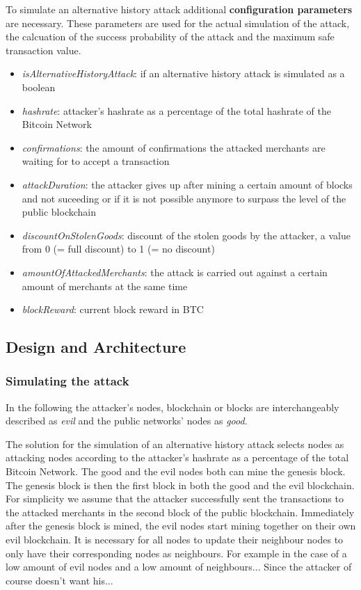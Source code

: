 To simulate an alternative history attack additional \textbf{configuration parameters} are necessary. These parameters are used for the actual simulation of the attack, the calcuation of the success probability of the attack and the maximum safe transaction value.

\begin{itemize}
\item \textit{isAlternativeHistoryAttack}: if an alternative history attack is simulated as a boolean
\item \textit{hashrate}: attacker's hashrate as a percentage of the total hashrate of the Bitcoin Network
\item \textit{confirmations}: the amount of confirmations the attacked merchants are waiting for to accept a transaction
\item \textit{attackDuration}: the attacker gives up after mining a certain amount of blocks and not suceeding or if it is not possible anymore to surpass the level of the public blockchain
\item \textit{discountOnStolenGoods}: discount of the stolen goods by the attacker, a value from 0 (= full discount) to 1 (= no discount)
\item \textit{amountOfAttackedMerchants}: the attack is carried out against a certain amount of merchants at the same time
\item \textit{blockReward}: current block reward in BTC
\end{itemize}

\subsection{Design and Architecture}

\subsubsection{Simulating the attack}

In the following the attacker's nodes, blockchain or blocks are interchangeably described as \textit{evil} and the public networks' nodes as \textit{good}.\linebreak

The solution for the simulation of an alternative history attack selects nodes as attacking nodes according to the attacker's hashrate as a percentage of the total Bitcoin Network.
The good and the evil nodes both can mine the genesis block. The genesis block is then the first block in both the good and the evil blockchain. For simplicity we assume that the attacker successfully sent the transactions to the attacked merchants in the second block of the public blockchain. Immediately after the genesis block is mined, the evil nodes start mining together on their own evil blockchain. It is necessary for all nodes to update their neighbour nodes to only have their corresponding nodes as neighbours. For example in the case of a low amount of evil nodes and a low amount of neighbours... Since the attacker of course doesn't want his...\linebreak

